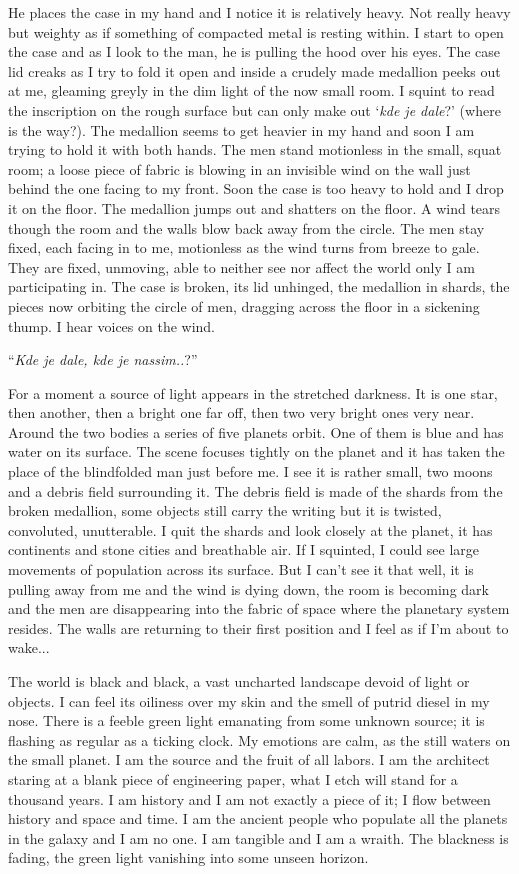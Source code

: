 \documentclass[
]{article}
\begin{document}
He places the case in my hand and I notice it is relatively heavy. Not
really heavy but weighty as if something of compacted metal is resting
within. I start to open the case and as I look to the man, he is pulling
the hood over his eyes. The case lid creaks as I try to fold it open and
inside a crudely made medallion peeks out at me, gleaming greyly in the
dim light of the now small room. I squint to read the inscription on the
rough surface but can only make out `\emph{kde je dale}?' (where is the
way?). The medallion seems to get heavier in my hand and soon I am
trying to hold it with both hands. The men stand motionless in the
small, squat room; a loose piece of fabric is blowing in an invisible
wind on the wall just behind the one facing to my front. Soon the case
is too heavy to hold and I drop it on the floor. The medallion jumps out
and shatters on the floor. A wind tears though the room and the walls
blow back away from the circle. The men stay fixed, each facing in to
me, motionless as the wind turns from breeze to gale. They are fixed,
unmoving, able to neither see nor affect the world only I am
participating in. The case is broken, its lid unhinged, the medallion in
shards, the pieces now orbiting the circle of men, dragging across the
floor in a sickening thump. I hear voices on the wind.

``\emph{Kde je dale, kde je nassim..}?''

For a moment a source of light appears in the stretched darkness. It is
one star, then another, then a bright one far off, then two very bright
ones very near. Around the two bodies a series of five planets orbit.
One of them is blue and has water on its surface. The scene focuses
tightly on the planet and it has taken the place of the blindfolded man
just before me. I see it is rather small, two moons and a debris field
surrounding it. The debris field is made of the shards from the broken
medallion, some objects still carry the writing but it is twisted,
convoluted, unutterable. I quit the shards and look closely at the
planet, it has continents and stone cities and breathable air. If I
squinted, I could see large movements of population across its surface.
But I can't see it that well, it is pulling away from me and the wind is
dying down, the room is becoming dark and the men are disappearing into
the fabric of space where the planetary system resides. The walls are
returning to their first position and I feel as if I'm about to wake...

The world is black and black, a vast uncharted landscape devoid of light
or objects. I can feel its oiliness over my skin and the smell of putrid
diesel in my nose. There is a feeble green light emanating from some
unknown source; it is flashing as regular as a ticking clock. My
emotions are calm, as the still waters on the small planet. I am the
source and the fruit of all labors. I am the architect staring at a
blank piece of engineering paper, what I etch will stand for a thousand
years. I am history and I am not exactly a piece of it; I flow between
history and space and time. I am the ancient people who populate all the
planets in the galaxy and I am no one. I am tangible and I am a wraith.
The blackness is fading, the green light vanishing into some unseen
horizon.
\end{document}
